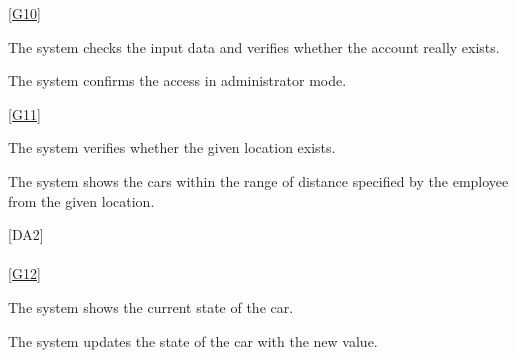 \documentclass[11pt,a4paper]{report}
\begin{document}
\noindent\ref{G10} \\
\begin{Req}[resume]
\item The system checks the input data and verifies whether the account really exists.
\item The system confirms the access in administrator mode.
\end{Req}
\noindent\ref{G11} \\
\begin{Req}[resume]
\item The system verifies whether the given location exists.
\item The system shows the cars within the range of distance specified by the employee from the given location.
\end{Req}
\hspace{0.4cm}[DA2] \\
\noindent\\
\ref{G12} \\
\begin{Req}[resume]
\item The system shows the current state of the car.
\item The system updates the state of the car with the new value.
\end{Req}
\end{document}
